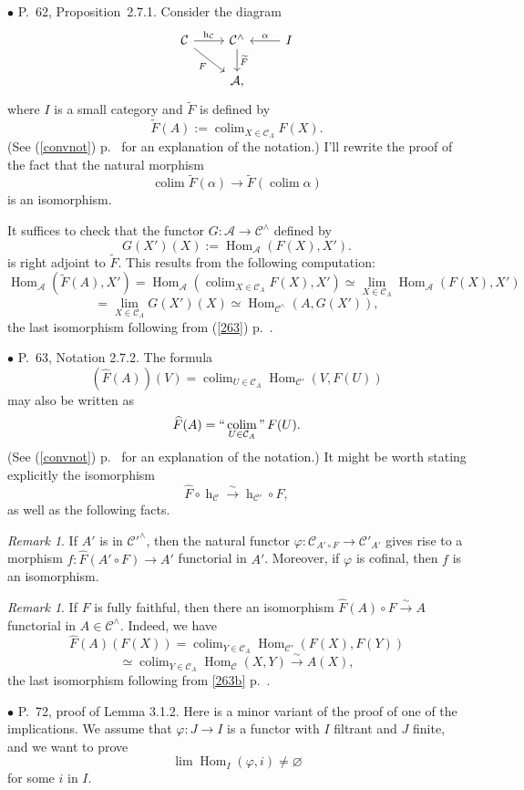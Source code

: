 \documentclass[12pt]{article}
\theoremstyle{remark}%
\newtheorem{rk}[thm]{Remark}
\newcommand{\bu}{\bullet}
\newcommand{\n}{\noindent}
\newcommand{\cc}{\mathcal}
\newcommand{\A}{\mathcal A}
\newcommand{\C}{\mathcal C}
\newcommand{\p}{\varphi}
\newcommand{\xr}{\xrightarrow}
\newcommand{\pr}{Proposition}
\newcommand{\cn}{(See (\ref{convnot}) p.~\pageref{convnot} for an explanation of the notation.) }
\DeclareMathOperator*{\coli}{colim}
\DeclareMathOperator*{\icolim}{``\coli"}
\DeclareMathOperator{\hy}{h}
\DeclareMathOperator{\Hom}{Hom}
\DeclareMathOperator{\h}{Hom}
\begin{document}

\n$\bu$ P.~62, \pr\ 2.7.1. Consider the diagram 
%
\begin{equation}\label{271b}
\begin{tikzcd}
\C\ar{r}{\hy_\C}\ar{dr}[swap]{F}&\C^\wedge\ar{d}{\widetilde F}&I\ar{l}[swap]{\alpha}\\
&\A,
\end{tikzcd}
\end{equation} 
% 
where $I$ is a small category and $\widetilde F$ is defined by 
$$
\widetilde F(A):=\coli_{X\in\C_A}F(X). 
$$
\cn I'll rewrite the proof of the fact that the natural morphism 
%
$$
\coli\widetilde F(\alpha)\to
\widetilde F\left(\coli\alpha\right) 
$$ 
% 
is an isomorphism. 

It suffices to check that the functor $G:\A\to\C^\wedge$ defined by 
$$
G(X')(X):=\Hom_{\A}(F(X),X').
$$ 
is right adjoint to $\widetilde F$. This results from the following computation: 
$$
\Hom_{\A}\left(\widetilde F(A),X'\right)=
\Hom_{\A}\left(\coli_{X\in\C_A}F(X),X'\right)\simeq 
\lim_{X\in\C_A}\Hom_{\A}(F(X),X')
$$
$$
=\lim_{X\in\C_A}G(X')(X)\simeq\Hom_{\C^\wedge}(A,G(X')), 
$$ 
the last isomorphism following from (\ref{263}) p.~\pageref{263}. 


\n$\bu$ P.~63, Notation 2.7.2. The formula 
$$
(\widehat F(A))(V)=\coli_{U\in\C_A}\Hom_{\C'}(V,F(U))
$$
may also be written as 
$$
\widehat F(A)=\icolim_{U\in\C_A}F(U).
$$
\cn It might be worth stating explicitly the isomorphism 
$$
\widehat F\circ\hy_\C\xr\sim\hy_{\C'}\circ F,
$$
as well as the following facts. 

\begin{rk}\label{cof}
If $A'$ is in $\cc C'^\wedge$, then the natural functor $\p:\cc C_{A'\circ F}\to\cc C'_{A'}$ gives rise to a morphism $f:\widehat F(A'\circ F)\to A'$ functorial in $A'$. Moreover, if $\p$ is cofinal, then $f$ is an isomorphism. 
\end{rk} 

\begin{rk}
If $F$ is fully faithful, then there an isomorphism $\widehat F(A)\circ F\xr\sim A$ functorial in $A\in\C^\wedge$. Indeed, we have 
$$
\widehat F(A)(F(X))=\coli_{Y\in\C_A}\Hom_{\C'}(F(X),F(Y))
$$
$$
\simeq\coli_{Y\in\C_A}\Hom_\C(X,Y)\xr\sim A(X),
$$
the last isomorphism following from \eqref{263b} p.~\pageref{263b}. 
\end{rk} 


\n$\bu$ P.~72, proof of Lemma 3.1.2. Here is a minor variant of the proof of one of the implications. We assume that $\p:J\to I$ is a functor with $I$ filtrant and $J$ finite, and we want to prove 
$$
\lim\h_I(\p,i)\neq\varnothing
$$ 
for some $i$ in $I$. 
\end{document}
